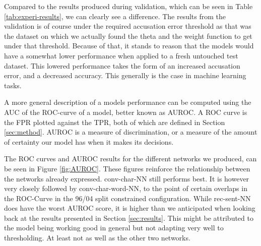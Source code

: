 Compared to the results produced during validation, which can be seen in
Table \ref{tab:experi-results}, we can clearly see a difference. The results
from the validation is of course under the required accusation error threshold
as that was the dataset on which we actually found the theta and the weight
function to get under that threshold. Because of that, it stands to reason that
the models would have a somewhat lower performance when applied to a fresh
untouched test dataset. This lowered performance takes the form of an increased
accusation error, and a decreased accuracy. This generally is the case in
machine learning tasks.

A more general description of a models performance can be computed using the
\gls{AUC} of the \gls{ROC}-curve of a model, better known as \gls{AUROC}.
A \gls{ROC} curve is the \gls{FPR} plotted against the \gls{TPR}, both of
which are defined in Section \ref{sec:method}. \gls{AUROC} is a measure of
discrimination, or a measure of the amount of certainty our model has when it
makes its decisions. 

The ROC curves and AUROC results for the different networks we produced, can
be seen in Figure \ref{fig:AUROC}. These figures reinforce the relationship
between the networks already expressed. \gls{conv-char-NN} still performs
best. It is however very closely followed by \gls{conv-char-word-NN}, to the
point of certain overlaps in the ROC-Curve in the 96/04 split constrained
configuration. While \gls{rec-sent-NN} does have the worst AUROC score, it is
higher than we anticipated when looking back at the results presented in Section
\ref{sec:results}. This might be attributed to the model being working good in
general but not adapting very well to thresholding. At least not as well as the
other two networks.

